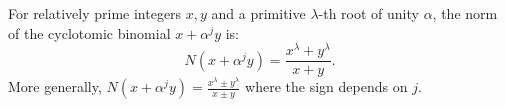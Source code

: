 For relatively prime integers $x, y$ and a primitive $\lambda$-th root of unity $\alpha$, the norm of the cyclotomic binomial $x + \alpha^j y$ is:
$$N(x + \alpha^j y) = \frac{x^\lambda + y^\lambda}{x + y}.$$
More generally, $N(x + \alpha^j y) = \frac{x^\lambda \pm y^\lambda}{x \pm y}$ where the sign depends on $j$.
